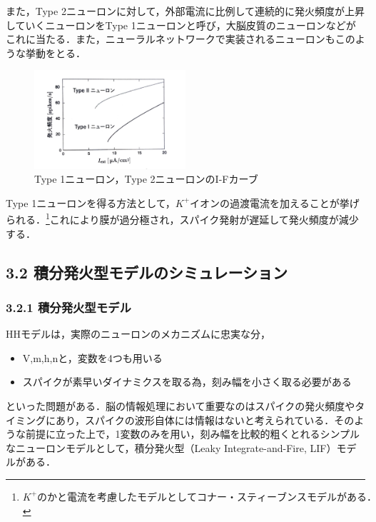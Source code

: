 \documentclass[dvipdfmx, A4j, twocolumn, 10.5pt]{jsarticle}
\begin{document}
また，Type \romannumeral 2ニューロンに対して，外部電流に比例して連続的に発火頻度が上昇していくニューロンをType \romannumeral 1ニューロンと呼び，大脳皮質のニューロンなどがこれに当たる．また，ニューラルネットワークで実装されるニューロンもこのような挙動をとる．
\begin{figure}[h]
    \centering
    \includegraphics[width=0.5\textwidth]{images/i_f_.pdf}
    \caption{Type \romannumeral 1ニューロン，Type \romannumeral 2ニューロンのI-Fカーブ}
\end{figure}
Type \romannumeral 1ニューロンを得る方法として，$K^{+}$イオンの過渡電流を加えることが挙げられる．\footnote{$K^{+}のかと電流を考慮したモデルとしてコナー・スティーブンスモデルがある．$}これにより膜が過分極され，スパイク発射が遅延して発火頻度が減少する．

\vspace{\baselineskip}
\vspace{\baselineskip}

\subsection*{3.2 積分発火型モデルのシミュレーション}
\subsubsection*{3.2.1 積分発火型モデル}

HHモデルは，実際のニューロンのメカニズムに忠実な分，
\begin{itemize}
 \item V,m,h,nと，変数を4つも用いる
 \item スパイクが素早いダイナミクスを取る為，刻み幅を小さく取る必要がある
\end{itemize}

といった問題がある．脳の情報処理において重要なのはスパイクの発火頻度やタイミングにあり，スパイクの波形自体には情報はないと考えられている．そのような前提に立った上で，1変数のみを用い，刻み幅を比較的粗くとれるシンプルなニューロンモデルとして，積分発火型（Leaky Integrate-and-Fire, LIF）モデルがある．
\end{document}

